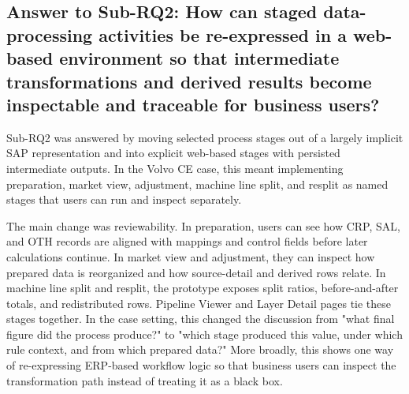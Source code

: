 

\subsection{Answer to Sub-RQ2: How can staged data-processing activities be re-expressed in a web-based environment so that intermediate transformations and derived results become inspectable and traceable for business users?}

Sub-RQ2 was answered by moving selected process stages out of a largely implicit SAP representation and into explicit web-based stages with persisted intermediate outputs. In the Volvo CE case, this meant implementing preparation, market view, adjustment, machine line split, and resplit as named stages that users can run and inspect separately.

The main change was reviewability. In preparation, users can see how CRP, SAL, and OTH records are aligned with mappings and control fields before later calculations continue. In market view and adjustment, they can inspect how prepared data is reorganized and how source-detail and derived rows relate. In machine line split and resplit, the prototype exposes split ratios, before-and-after totals, and redistributed rows. Pipeline Viewer and Layer Detail pages tie these stages together. In the case setting, this changed the discussion from "what final figure did the process produce?" to "which stage produced this value, under which rule context, and from which prepared data?" More broadly, this shows one way of re-expressing ERP-based workflow logic so that business users can inspect the transformation path instead of treating it as a black box.




